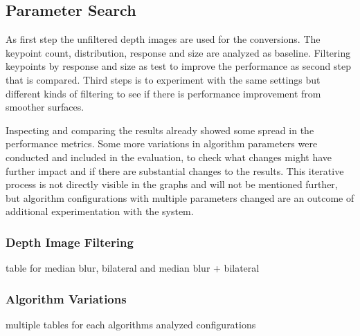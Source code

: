\subsection{Parameter Search}

As first step the unfiltered depth images are used for the conversions.
The keypoint count, distribution, response and size are analyzed as baseline.
Filtering keypoints by response and size as test to improve the performance as second step that is compared.
Third steps is to experiment with the same settings but different kinds of filtering to see if there is performance improvement from smoother surfaces.

Inspecting and comparing the results already showed some spread in the performance metrics.
Some more variations in algorithm parameters were conducted and included in the evaluation, to check what changes might have further impact and if there are substantial changes to the results.
This iterative process is not directly visible in the graphs and will not be mentioned further, but algorithm configurations with multiple parameters changed are an outcome of additional experimentation with the system.

\subsubsection{Depth Image Filtering}

table for median blur, bilateral and median blur + bilateral

\subsubsection{Algorithm Variations}

multiple tables for each algorithms analyzed configurations

